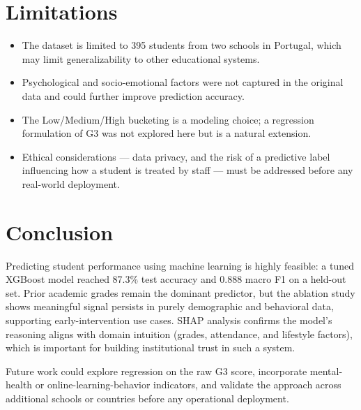 \documentclass[12pt, a4paper]{article}
\begin{document}
\section{Limitations}
\label{sec:limitations}
\begin{itemize}[noitemsep]
    \item The dataset is limited to 395 students from two schools in Portugal, which may limit generalizability to other educational systems.
    \item Psychological and socio-emotional factors were not captured in the original data and could further improve prediction accuracy.
    \item The Low/Medium/High bucketing is a modeling choice; a regression formulation of G3 was not explored here but is a natural extension.
    \item Ethical considerations — data privacy, and the risk of a predictive label influencing how a student is treated by staff — must be addressed before any real-world deployment.
\end{itemize}

\section{Conclusion}
Predicting student performance using machine learning is highly feasible: a tuned XGBoost
model reached 87.3\% test accuracy and 0.888 macro F1 on a held-out set. Prior academic
grades remain the dominant predictor, but the ablation study shows meaningful signal persists
in purely demographic and behavioral data, supporting early-intervention use cases. SHAP
analysis confirms the model's reasoning aligns with domain intuition (grades, attendance, and
lifestyle factors), which is important for building institutional trust in such a system.

Future work could explore regression on the raw G3 score, incorporate mental-health or
online-learning-behavior indicators, and validate the approach across additional schools or
countries before any operational deployment.
\end{document}
